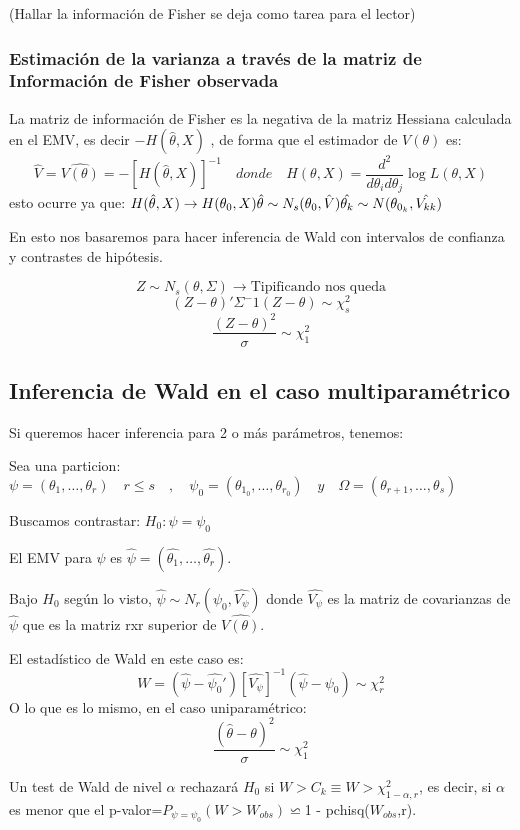 (Hallar la información de Fisher se deja como tarea para el lector)

\subsubsection{Estimación de la varianza a través de la matriz de Información de Fisher observada}

La matriz de información de Fisher es la negativa de la matriz Hessiana calculada en el EMV, es decir $-H(\hat{\theta},X)$
, de forma que el estimador de $V(\theta)$ es:
\[
\hat{V}=\hat{V(\theta)}=-[H(\hat{\theta},X)]^{-1} \quad donde\quad H(\theta,X)=\frac{d^2}{d \theta_i d \theta_j} \log L(\theta,X)
\]
esto ocurre ya que:
\(
H(\hat{\theta},X) \to H(\theta_0,X)
\\ \hat{\theta} \sim N_s(\theta_0,\hat{V})
\hat{\theta_k} \sim N(\theta_{0_k},\hat{V_{kk}})
\)

En esto nos basaremos para hacer inferencia de Wald con intervalos de confianza y contrastes de hipótesis.

\[
Z \sim N_s(\theta,\Sigma) \to \text{Tipificando nos queda}
\]
\[
(Z-\theta)' \Sigma^-1 (Z-\theta) \sim \chi_s^2
\]
\[
\frac{(Z-\theta)^2}{\sigma} \sim \chi^2_1
\]

\subsection{Inferencia de Wald en el caso multiparamétrico}

Si queremos hacer inferencia para 2 o más parámetros, tenemos:

Sea una particion:
\(
\psi=(\theta_1,\dots,\theta_r) \quad r \leq s \quad, \quad
\psi_0=(\theta_{1_0},\dots,\theta_{r_0}) \quad y \quad 
\Omega=(\theta_{r+1},\dots,\theta_s)
\)

Buscamos contrastar: $H_0:\psi=\psi_0$

El EMV para $\psi$ es $\hat{\psi}=(\hat{\theta_1},\dots,\hat{\theta_r})$.

Bajo $H_0$ según lo visto, $\hat{\psi}\sim N_r(\psi_0,\hat{V_\psi})$
donde $\hat{V_\psi}$ es la matriz de covarianzas de $\hat{\psi}$ que es la matriz rxr superior de $\hat{V(\theta)}$.

El estadístico de Wald en este caso es:
\[
W=(\hat{\psi}-\hat{\psi_0}')[\hat{V_\psi}]^{-1}(\hat{\psi}-\psi_0)\sim\chi^2_r
\]
O lo que es lo mismo, en el caso uniparamétrico:
\[
\frac{(\hat{\theta}-\theta)^2}{\sigma}\sim \chi^2_1
\]

Un test de Wald de nivel $\alpha$ rechazará $H_0$ si $W>C_k\equiv W>\chi^2_{1-\alpha,r}$, es decir, si
$\alpha$ es menor que el p-valor=$P_{\psi=\psi_0}(W>W_{obs})\backsimeq$1 - pchisq($W_{obs}$,r).

